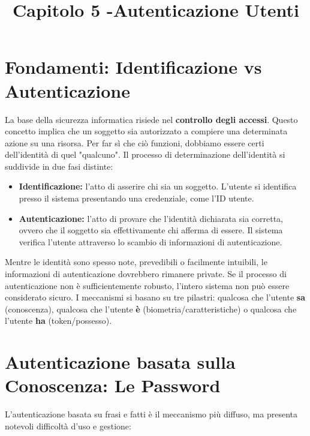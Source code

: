 \documentclass{article}
\title{Capitolo 5 -Autenticazione Utenti}
\author{}
\date{}
\begin{document}
\maketitle

\section*{Fondamenti: Identificazione vs Autenticazione}

La base della sicurezza informatica risiede nel \textbf{controllo degli accessi}. Questo concetto implica che un soggetto sia autorizzato a compiere una determinata azione su una risorsa. Per far sì che ciò funzioni, dobbiamo essere certi dell'identità di quel "qualcuno". Il processo di determinazione dell'identità si suddivide in due fasi distinte:

\begin{itemize}
    \item \textbf{Identificazione:} l'atto di asserire chi sia un soggetto. L'utente si identifica presso il sistema presentando una credenziale, come l'ID utente.
    \item \textbf{Autenticazione:} l'atto di provare che l'identità dichiarata sia corretta, ovvero che il soggetto sia effettivamente chi afferma di essere. Il sistema verifica l'utente attraverso lo scambio di informazioni di autenticazione.
\end{itemize}

Mentre le identità sono spesso note, prevedibili o facilmente intuibili, le informazioni di autenticazione dovrebbero rimanere private. Se il processo di autenticazione non è sufficientemente robusto, l'intero sistema non può essere considerato sicuro. I meccanismi si basano su tre pilastri: qualcosa che l'utente \textbf{sa} (conoscenza), qualcosa che l'utente \textbf{è} (biometria/caratteristiche) o qualcosa che l'utente \textbf{ha} (token/possesso).

\vspace{0.8cm}

\section*{Autenticazione basata sulla Conoscenza: Le Password}

L'autenticazione basata su frasi e fatti è il meccanismo più diffuso, ma presenta notevoli difficoltà d'uso e gestione:
\end{document}
